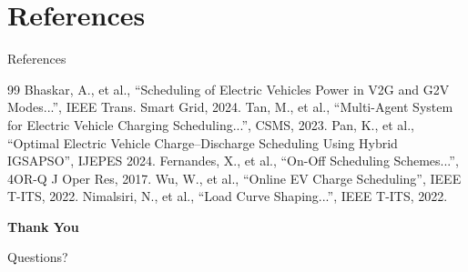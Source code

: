 \documentclass{beamer}
\begin{document}
\section{References}
\begin{frame}{References}
  \footnotesize
  \begin{thebibliography}{99}
     Bhaskar, A., et al., ``Scheduling of Electric Vehicles Power in V2G and G2V Modes...'', IEEE Trans. Smart Grid, 2024.
     Tan, M., et al., ``Multi-Agent System for Electric Vehicle Charging Scheduling...'', CSMS, 2023.
     Pan, K., et al., ``Optimal Electric Vehicle Charge--Discharge Scheduling Using Hybrid IGSAPSO'', IJEPES 2024.
     Fernandes, X., et al., ``On-Off Scheduling Schemes...'', 4OR-Q J Oper Res, 2017.
     Wu, W., et al., ``Online EV Charge Scheduling'', IEEE T-ITS, 2022.
     Nimalsiri, N., et al., ``Load Curve Shaping...'', IEEE T-ITS, 2022.
  \end{thebibliography}
\end{frame}

\begin{frame}[plain]
  \centering
  \vspace{2cm}
  {\Huge \textbf{Thank You}}
  
  \vspace{1cm}
  \large Questions?
\end{frame}
\end{document}
